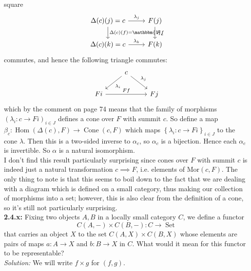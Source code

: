 \documentclass[a4paper]{article}
\DeclareMathOperator{\Hom}{Hom}
\DeclareMathOperator{\Set}{Set}
\DeclareMathOperator{\Cone}{Cone}
\begin{document}
    square
    \begin{equation*}
    \begin{tikzcd}
        \Delta(c)(j) = c \arrow[r, "\lambda_j"] \arrow[d
        , "\Delta(c)(f) = \mathbbm{1}_c"] & F(j) \arrow[d,
        "Ff"]\\
        \Delta(c)(k) = c \arrow[r, "\lambda_k"] & F(k)
    \end{tikzcd}
    \end{equation*}
    commutes, and hence the following triangle commutes:
    \begin{equation*}
    \begin{tikzcd}
        & c \arrow[dl, "\lambda_i"] \arrow[dr, "\lambda_j"] &\\
        Fi \arrow[rr, "Ff"] & & Fj
    \end{tikzcd}
    \end{equation*}
    which by the comment on page 74 means that the family of
    morphisms  $\left( \lambda_i  \colon c \to Fi \right)_{i \in J}$ defines
    a cone over $F$ with summit $c$. So define a map
    $\beta_c  \colon \Hom(\Delta(c), F) \to \Cone(c,F)$ which maps
    $\left\{ \lambda_i  \colon c \to F i \right\}_{i \in J}$ to
    the cone $\lambda$. Then this is a two-sided inverse to  $\alpha_c$, so
    $\alpha_c$ is a bijection. Hence each
    $\alpha_c$ is invertible. So $\alpha$ is a natural isomorphism.\\
    \linebreak
    I don't find this result particularly surprising since cones over $F$ with
    summit $c$ is indeed just a natural transformation
    $c \implies F$, i.e. elements of
    $\text{Mor}(c, F)$. The only thing to note is that
    this seems to boil down to the fact that we are dealing with a diagram
    which is defined on a small category, thus making our collection of
    morphisms into a set; however, this is also clear from the
    definition of a cone, so it's still not particularly surprising.\\
    \linebreak
    \textbf{2.4.x:} Fixing two objects $A,B$ in a locally small category $C$,
    we define a functor
    \[
    C(A,-) \times C(B,-)  \colon C \to \Set
    \] 
    that carries an object $X$ to the set
    $C(A,X) \times C(B,X)$ whose elements are pairs of maps
    $a  \colon A \to X$ and $b  \colon B \to X$ in $C$. What would it mean for
    this functor to be representable?\\
    \linebreak
    \textit{Solution:} We will write $f \times g$ for $(f,g)$.\\
\end{document}
